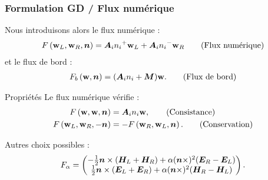 \begin{frame}
\frametitle{Formulation GD / Flux numérique}
\vfill
Nous introduisons alors le flux numérique :
\begin{align}
	F\left(\bm{\mathrm{w}}_L,\bm{\mathrm{w}}_R,\bm{n}\right) = {\bm{A}_{i}n_{i}}^{+} \bm{\mathrm{w}}_L + {\bm{A}_{i}n_{i}}^{-} \bm{\mathrm{w}}_R
	\tag{Flux numérique}
\end{align}
et le flux de bord :
\begin{align}
	F_b\left(\bm{\mathrm{w}},\bm{n}\right) = ({\bm{A}_{i}n_{i}} + \bm{M}) \bm{\mathrm{w}} .
	\tag{Flux de bord}
\end{align}
\vfill
\begin{block}{Propriétés}
Le flux numérique vérifie :
\begin{subequations}
\begin{align*}
	F\left(\bm{\mathrm{w}},\bm{\mathrm{w}},\bm{n}\right) &= {\bm{A}_{i}n_{i}} \bm{\mathrm{w}} ,
	\tag{Consistance} \\
	F\left(\bm{\mathrm{w}}_L,\bm{\mathrm{w}}_R,-\bm{n}\right) &= - F\left(\bm{\mathrm{w}}_R,\bm{\mathrm{w}}_L,\bm{n}\right) .
	\tag{Conservation}
\end{align*}
\end{subequations}
\end{block}
\vfill
Autres choix possibles :
\begin{align*}
	F_\alpha =
	\begin{pmatrix}
		- \frac{1}{2} \bm{n} \times (\bm{H}_L + \bm{H}_R)
		+ \alpha (\bm{n} \times)^2 (\bm{E}_R - \bm{E}_L) \\
		\frac{1}{2} \bm{n} \times (\bm{E}_L + \bm{E}_R)
		+ \alpha (\bm{n} \times)^2 (\bm{H}_R - \bm{H}_L)
	\end{pmatrix} .
\end{align*}
\vfill
\end{frame}

